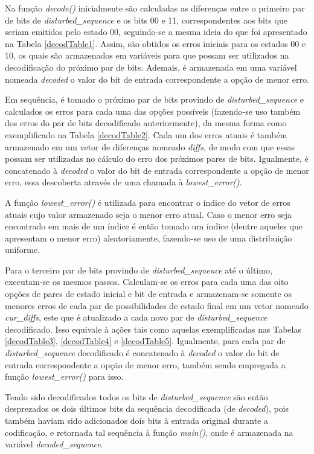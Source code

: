 \documentclass[12pt]{article}
\begin{document}
Na função \emph{decode()} inicialmente são calculadas as diferenças entre o primeiro par de bits de \emph{disturbed\_sequence} e os bits 00 e 11, correspondentes aos bits que seriam emitidos pelo estado 00, seguindo-se a mesma ideia do que foi apresentado na Tabela \ref{decodTable1}. Assim, são obtidos os erros iniciais para os estados 00 e 10, os quais são armazenados em variáveis para que possam ser utilizados na decodificação do próximo par de bits. Ademais, é armazenada em uma variável nomeada \emph{decoded} o valor do bit de entrada correspondente a opção de menor erro. 

Em sequência, é tomado o próximo par de bits provindo de \emph{disturbed\_sequence} e calculados os erros para cada uma das opções possíveis (fazendo-se uso também dos erros do par de bits decodificado anteriormente), da mesma forma como exemplificado na Tabela \ref{decodTable2}. Cada um dos erros atuais é também armazenado em um vetor de diferenças nomeado \emph{diffs}, de modo com que essas possam ser utilizadas no cálculo do erro dos próximos pares de bits. Igualmente, é concatenado à \emph{decoded} o valor do bit de entrada correspondente a opção de menor erro, essa descoberta através de uma chamada à \emph{lowest\_error()}.

A função \emph{lowest\_error()} é utilizada para encontrar o índice do vetor de erros atuais cujo valor armazenado seja o menor erro atual. Caso o menor erro seja encontrado em mais de um índice é então tomado um índice (dentre aqueles que apresentam o menor erro) aleatoriamente, fazendo-se uso de uma distribuição uniforme.

Para o terceiro par de bits provindo de \emph{disturbed\_sequence} até o último, executam-se os mesmos passos. Calculam-se os erros para cada uma das oito opções de pares de estado inicial e bit de entrada e armazenam-se somente os menores erros de cada par de possibilidades de estado final em um vetor nomeado \emph{cur\_diffs}, este que é atualizado a cada novo par de \emph{disturbed\_sequence} decodificado. Isso equivale à ações tais como aquelas exemplificadas nas Tabelas \ref{decodTable3}, \ref{decodTable4} e \ref{decodTable5}. Igualmente, para cada par de \emph{disturbed\_sequence} decodificado é concatenado à \emph{decoded} o valor do bit de entrada correspondente a opção de menor erro, também sendo empregada a função \emph{lowest\_error()} para isso.

Tendo sido decodificados todos os bits de \emph{disturbed\_sequence} são então desprezados os dois últimos bits da sequência decodificada (de \emph{decoded}), pois também haviam sido adicionados dois bits à entrada original durante a codificação, e retornada tal sequência à função \emph{main()}, onde é armazenada na variável \emph{decoded\_sequence}.
\end{document}
